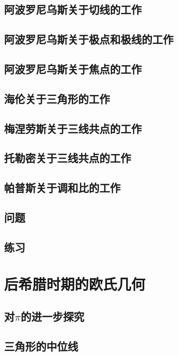\documentclass[cn,fancy,blue,11pt]{elegantbook}
\begin{document}
\section{阿波罗尼乌斯关于切线的工作}

\section{阿波罗尼乌斯关于极点和极线的工作}

\section{阿波罗尼乌斯关于焦点的工作}

\section{海伦关于三角形的工作}

\section{梅涅劳斯关于三线共点的工作}

\section{托勒密关于三线共点的工作}

\section{帕普斯关于调和比的工作}

\section{问题}

\section{练习}

\chapter{后希腊时期的欧氏几何}

\section{对$\pi$的进一步探究}

\section{三角形的中位线}
\end{document}
